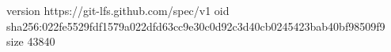 version https://git-lfs.github.com/spec/v1
oid sha256:022fe5529fdf1579a022dfd63cc9e30c0d92c3d40cb0245423bab40bf98509f9
size 43840
